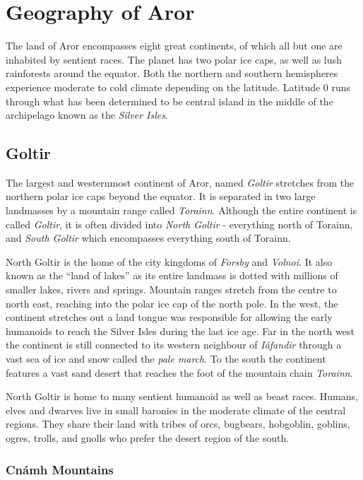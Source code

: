 \section{Geography of Aror}

The land of Aror encompasses eight great continents, of which all but one are
inhabited by sentient races. The planet has two polar ice caps, as well as lush
rainforests around the equator. Both the northern and southern hemispheres
experience moderate to cold climate depending on the latitude. Latitude 0 runs
through what has been determined to be central island in the middle of the
archipelago known as the \emph{Silver Isles}.

\subsection{Goltir}
\label{sec:Goltir}

The largest and westernmost continent of Aror, named \emph{Goltir} stretches
from the northern polar ice caps beyond the equator. It is separated in two
large landmasses by a mountain range called \emph{Torainn}. Although the
entire continent is called \emph{Goltir}, it is often divided into \emph{North
  Goltir} - everything north of Torainn, and \emph{South Goltir} which
encompasses everything south of Torainn.

North Goltir is the home of the city kingdoms of \emph{Forsby} and
\emph{Volnoi}. It also known as the ``land of lakes'' as its entire landmass
is dotted with millions of smaller lakes, rivers and springs. Mountain ranges
stretch from the centre to north east, reaching into the polar ice cap of the
north pole. In the west, the continent stretches out a land tongue was
responsible for allowing the early humanoids to reach the Silver Isles during
the last ice age. Far in the north west the continent is still connected to
its western neighbour of \emph{Iâfandir} through a vast sea of ice and snow
called the \emph{pale march}. To the south the continent features a vast sand
desert that reaches the foot of the mountain chain \emph{Torainn}.

North Goltir is home to many sentient humanoid as well as beast races. Humans,
elves and dwarves live in small baronies in the moderate climate of the
central regions. They share their land with tribes of orcs, bugbears,
hobgoblin, goblins, ogres, trolls, and gnolls who prefer the desert region of
the south.

\subsubsection{Cnámh Mountains}
\label{sec:Cnámh Mountains}

